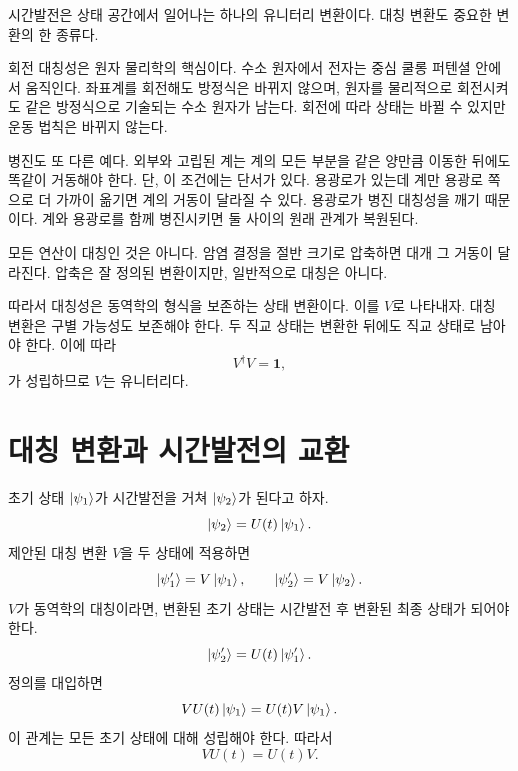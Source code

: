 시간발전은 상태 공간에서 일어나는 하나의 유니터리 변환이다. 대칭 변환도 중요한 변환의 한 종류다.

회전 대칭성은 원자 물리학의 핵심이다. 수소 원자에서 전자는 중심 쿨롱 퍼텐셜 안에서 움직인다. 좌표계를 회전해도 방정식은 바뀌지 않으며, 원자를 물리적으로 회전시켜도 같은 방정식으로 기술되는 수소 원자가 남는다. 회전에 따라 상태는 바뀔 수 있지만 운동 법칙은 바뀌지 않는다.

병진도 또 다른 예다. 외부와 고립된 계는 계의 모든 부분을 같은 양만큼 이동한 뒤에도 똑같이 거동해야 한다. 단, 이 조건에는 단서가 있다. 용광로가 있는데 계만 용광로 쪽으로 더 가까이 옮기면 계의 거동이 달라질 수 있다. 용광로가 병진 대칭성을 깨기 때문이다. 계와 용광로를 함께 병진시키면 둘 사이의 원래 관계가 복원된다.

모든 연산이 대칭인 것은 아니다. 암염 결정을 절반 크기로 압축하면 대개 그 거동이 달라진다. 압축은 잘 정의된 변환이지만, 일반적으로 대칭은 아니다.

따라서 대칭성은 동역학의 형식을 보존하는 상태 변환이다. 이를 \(V\)로 나타내자. 대칭 변환은 구별 가능성도 보존해야 한다. 두 직교 상태는 변환한 뒤에도 직교 상태로 남아야 한다. 이에 따라
\begin{equation}
V^\dagger V=\mathbf 1,
\end{equation}
가 성립하므로 \(V\)는 유니터리다.

\section{대칭 변환과 시간발전의 교환}

초기 상태 \(\left\lvert\psi_1\right\rangle\)가 시간발전을 거쳐 \(\left\lvert\psi_2\right\rangle\)가 된다고 하자.
\begin{equation}
\left\lvert\psi_2\right\rangle=U(t)\left\lvert\psi_1\right\rangle.
\end{equation}
제안된 대칭 변환 \(V\)을 두 상태에 적용하면
\begin{equation}
\left\lvert\psi_1'\right\rangle=V\left\lvert\psi_1\right\rangle,
\qquad
\left\lvert\psi_2'\right\rangle=V\left\lvert\psi_2\right\rangle.
\end{equation}
\(V\)가 동역학의 대칭이라면, 변환된 초기 상태는 시간발전 후 변환된 최종 상태가 되어야 한다.
\begin{equation}
\left\lvert\psi_2'\right\rangle=U(t)\left\lvert\psi_1'\right\rangle.
\end{equation}
정의를 대입하면
\begin{equation}
VU(t)\left\lvert\psi_1\right\rangle
=
U(t)V\left\lvert\psi_1\right\rangle.
\end{equation}
이 관계는 모든 초기 상태에 대해 성립해야 한다. 따라서
\begin{equation}
VU(t)=U(t)V.
\end{equation}

